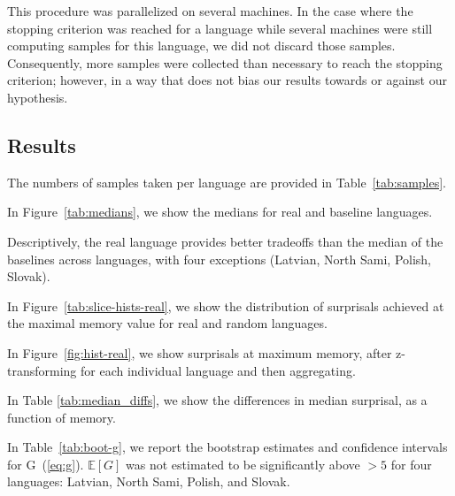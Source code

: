 \documentclass[11pt,letterpaper]{article}
\newcommand{\E}[0]{\mathbb{E}}
\begin{document}
This procedure was parallelized on several machines.
In the case where the stopping criterion was reached for a language while several machines were still computing samples for this language, we did not discard those samples.
Consequently, more samples were collected than necessary to reach the stopping criterion; however, in a way that does not bias our results towards or against our hypothesis.





\subsection{Results}

The numbers of samples taken per language are provided in Table~\ref{tab:samples}.


In Figure~\ref{tab:medians}, we show the medians for real and baseline languages.

Descriptively, the real language provides better tradeoffs than the median of the baselines across languages, with four exceptions (Latvian, North Sami, Polish, Slovak).

In Figure~\ref{tab:slice-hists-real}, we show the distribution of surprisals achieved at the maximal memory value for real and random languages.

In Figure~\ref{fig:hist-real}, we show surprisals at maximum memory, after z-transforming for each individual language and then aggregating.

In Table \ref{tab:median_diffs}, we show the differences in median surprisal, as a function of memory.


In Table~\ref{tab:boot-g}, we report the bootstrap estimates and confidence intervals for G~(\ref{eq:g}).
$\E[G]$ was not estimated to be significantly above $>5$ for four languages: Latvian, North Sami, Polish, and Slovak.
\end{document}
